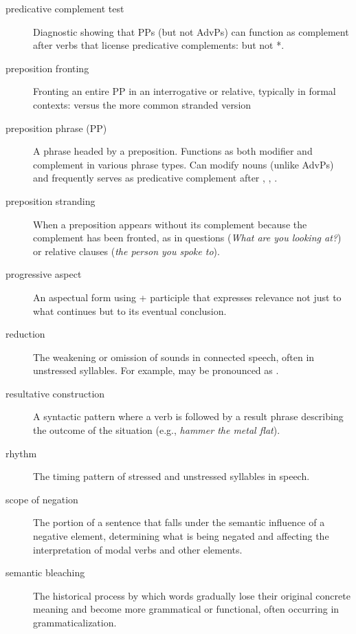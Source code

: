 \begin{description}
\item[predicative complement test] Diagnostic showing that PPs (but not AdvPs) can function as complement after verbs that license predicative complements:  but not *.

\item[preposition fronting] Fronting an entire PP in an interrogative or relative, typically in formal contexts:  versus the more common stranded version 

\item[preposition phrase (PP)] A phrase headed by a preposition. Functions as both modifier and complement in various phrase types. Can modify nouns (unlike AdvPs) and frequently serves as predicative complement after , , .

\item[preposition stranding] When a preposition appears without its complement because the complement has been fronted, as in questions (\textit{What are you looking \emph{at}?}) or relative clauses (\textit{the person you spoke \emph{to}}).

\item[progressive aspect] An aspectual form using  +  participle that expresses relevance not just to what continues but to its eventual conclusion.

\item[reduction] The weakening or omission of sounds in connected speech, often in unstressed syllables. For example,  may be pronounced as .

\item[resultative construction] A syntactic pattern where a verb is followed by a result phrase describing the outcome of the situation (e.g., \emph{hammer the metal flat}).

\item[rhythm] The timing pattern of stressed and unstressed syllables in speech.

\item[scope of negation] The portion of a sentence that falls under the semantic influence of a negative element, determining what is being negated and affecting the interpretation of modal verbs and other elements.

\item[semantic bleaching] The historical process by which words gradually lose their original concrete meaning and become more grammatical or functional, often occurring in grammaticalization.


\end{description}
